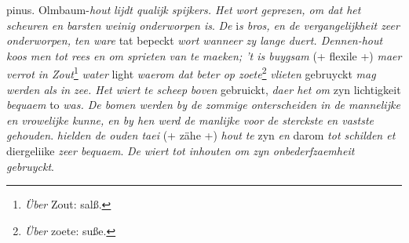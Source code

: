  pinus. \pend 
\pstart Olmbaum-\textit{hout}\protect{} \textit{lijdt qualijk spijkers. Het \protect{} wort geprezen, om dat het scheuren en barsten weinig onderworpen is}.
\pend 
\pstart \textit{De} \protect{} i\textit{s bros, en de vergangelijkheit zeer onderworpen, ten ware} tat bepeckt \textit{wort wanneer zy lange duert. Dennen-hout}\protect{} \textit{koos men tot rees en om sprieten van te maeken; 't is buygsam} (+ flexile +) \textit{maer verrot in Zout}\footnote{\textit{\"{U}ber} Zout: salß.} \textit{water}\protect{} light \textit{waerom dat beter op zoete}\protect{}\footnote{\textit{\"{U}ber} zoete: suße.} \textit{vlieten} gebruyckt \textit{mag werden als in zee. Het wiert te scheep}\protect{} \textit{boven}  gebruickt, \textit{daer het om} zyn lichtigkeit \textit{bequaem} to \textit{was. De bomen werden by de zommige onterscheiden in de mannelijke en vrowelijke kunne, en by hen werd de manlijke voor de sterckste en vastste gehouden}. \pend 
\pstart {}\protect{} \textit{hielden de ouden taei} (+ z\"{a}he +) \textit{hout}\protect{} \textit{te} zyn \textit{en} darom \textit{tot schilden et} diergeliike \textit{zeer bequaem}. 
\pend 
\pstart \textit{De} \protect{} \textit{wiert tot inhouten om zyn onbederfzaemheit gebruyckt}. 
\pend 
